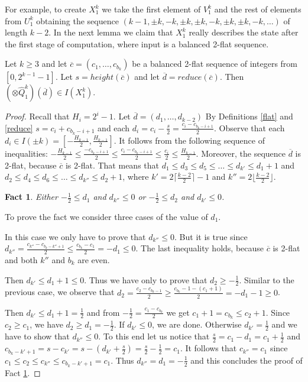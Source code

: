 \documentclass{llncs}
\newtheorem{fact}[theorem]{Fact}
\begin{document}
For example, to create $X^k_1$ we take the first element of $V^k_1$ and
the rest of elements from $U^k_1$ obtaining the sequence $(k-1,\pm
k,-k,\pm k,\pm k,-k,\pm k,\pm k, -k, \ldots)$ of length $k-2$. In the
next lemma we claim that $X^k_1$ really describes the state after the
first stage of computation, where input is a balanced 2-flat sequence.

\begin{lemma}\label{l6}
Let $k\ge 3$ and let $\overline{c} = (c_1,\ldots,c_{b_k})$ be a balanced
2-flat sequence of integers from $[0,2^{k-1}-1]$. Let $s =
height(\overline{c})$ and let $\overline{d} =
reduce(\overline{c})$. Then $(\otimes \hat{Q}^k_1)(\overline{d}) \in
I(X^k_1)$.
\end{lemma}
\begin{proof}
Recall that $H_i=2^i-1$. Let $\overline{d} = (d_1,\ldots,d_{k-2})$ By
Definitions \ref{flat} and \ref{reduce} $s=c_i+c_{b_k-i+1}$ and each
$d_i = c_i-\frac{s}{2} = \frac{c_i-c_{b_k-i+1}}{2}$. Observe that each
$d_i\in I(\pm k) = [-\frac{H_{k-1}}{2},\frac{H_{k-1}}{2}]$. It follows
from the following sequence of inequalities: $-\frac{H_{k-1}}{2} \le 
\frac{-c_{b_k-i+1}}{2} \le \frac{c_i-c_{b_k-i+1}}{2} \le \frac{c_i}{2} \le 
\frac{H_{k-1}}{2}$. Moreover, the sequence $\overline{d}$ is 2-flat, because 
$\overline{c}$ is 2-flat. That means that $d_1\le d_3\le d_5\le \ldots \le 
d_{k'} \le d_1+1$ and $d_2\le d_4\le d_6\le \ldots \le d_{k''} \le d_2+1$, 
where $k' = 2\lceil\frac{k-2}{2}\rceil-1$ and $k'' = 
2\lfloor\frac{k-2}{2}\rfloor$.
\begin{fact} \label{fct-13}
Either $-\frac{1}{2}\le d_1$ and $d_{k''}\le 0$ or $-\frac{1}{2}\le d_2$ 
and $d_{k'}\le 0$.
\end{fact}
To prove the fact we consider three cases of the value of $d_1$.

 In this case we only have to prove that 
$d_{k''}\le 0$. But it is true since $d_{k''}=\frac{c_{k''}-c_{b_k-k''+1}}{2} 
\le \frac{c_{b_k}-c_1}{2} = -d_1 \le 0$. The last inequality holds, because 
$\overline{c}$ is 2-flat and both $k''$ and $b_k$ are even.

 Then $d_{k'} \le d_1+1 \le 0$. Thus we have 
only to prove that $d_2\ge -\frac{1}{2}$. Similar to the previous case, we 
observe that $d_2 = \frac{c_2-c_{b_k-1}}{2} \ge \frac{c_{b_k}-1-(c_1+1)}{2} = 
-d_1-1 \ge 0$.

 Then $d_{k'} \le d_1+1 = \frac{1}{2}$
and from $-\frac{1}{2} = \frac{c_1-c_{b_k}}{2}$ we get $c_1+1 = c_{b_k} \le
c_2+1$. Since $c_2 \ge c_1$, we have $d_2 \ge d_1 = -\frac{1}{2}$. If $d_{k'}\le
0$, we are done. Otherwise $d_{k'} = \frac{1}{2}$ and we have to show that
$d_{k''} \le 0$. To this end let us notice that $\frac{s}{2} = c_1-d_1 =
c_1+\frac{1}{2}$ and $c_{b_k-k'+1} = s-c_{k'} = s-(d_{k'}+\frac{s}{2}) =
\frac{s}{2}-\frac{1}{2} = c_1$. It follows that $c_{k''} = c_1$ since $c_1 \le c_2
\le c_{k''} \le c_{b_k-k'+1} = c_1$. Thus $d_{k''} = d_1 = -\frac{1}{2}$ and this
concludes the proof of Fact \ref{fct-13}.


\end{proof}
\end{document}
